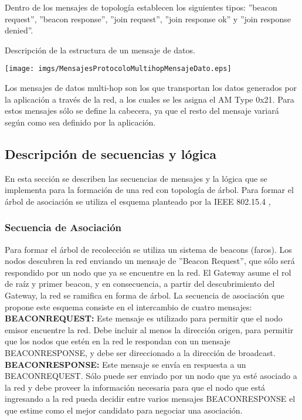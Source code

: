 Dentro de los mensajes de topología establecen los siguientes tipos: ''beacon request'', ''beacon response'', ''join request'', ''join response ok'' y ''join response denied''.

\begin{table}[H]
  \centering
  \caption{Descripción de la estructura de un mensaje de datos.}
 \texttt{[image: imgs/MensajesProtocoloMultihopMensajeDato.eps]}
\end{table}

Los mensajes de datos multi-hop son los que transportan los datos generados por la aplicación a través de la red, a los cuales se les asigna el AM Type 0x21. Para estos mensajes sólo se define la cabecera, ya que el resto del mensaje variará según como sea definido por la aplicación.

\subsection{Descripción de secuencias y lógica}
En esta sección se describen las secuencias de mensajes y la lógica que se implementa para la formación de una red con topología de árbol. Para formar el árbol de asociación se utiliza el esquema planteado por la IEEE 802.15.4 \cite{IEEE802154}, 
\subsubsection{Secuencia de Asociación}
Para formar el árbol de recolección se utiliza un sistema de beacons (faros). Los nodos descubren la red enviando un mensaje de ''Beacon Request'', que sólo será respondido por un nodo que ya se encuentre en la red. El Gateway asume el rol de raíz y primer beacon, y en consecuencia, a partir del descubrimiento del Gateway, la red se ramifica en forma de árbol. La secuencia de asociación que propone este esquema consiste en el intercambio de cuatro mensajes:\\
 
 \textbf{BEACON\textunderscore REQUEST:} Este mensaje es utilizado para permitir que el nodo emisor encuentre la red. Debe incluir al menos la dirección origen, para permitir que los nodos que estén en la red le respondan con un mensaje BEACON\textunderscore RESPONSE, y debe ser direccionado a la dirección de broadcast.\\
 
 \textbf{BEACON\textunderscore RESPONSE:} Este mensaje se envía en respuesta a un BEACON\textunderscore REQUEST. Sólo puede ser enviado por un nodo que ya esté asociado a la red y debe proveer la información necesaria para que el nodo que está ingresando a la red pueda decidir entre varios mensajes BEACON\textunderscore RESPONSE el que estime como el mejor candidato para negociar una asociación.\\
 
